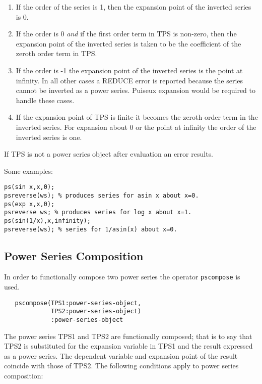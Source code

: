 \begin{enumerate}
\item If the order of the series is 1, then the expansion point of the
inverted series is 0.

\item If the order is 0 \emph{and} if the first order term in TPS
is non-zero, then the expansion point of the inverted series is taken
to be the coefficient of the zeroth order term in TPS.

\item If the order is -1 the expansion point of the inverted series
is the point at infinity.  In all other cases a REDUCE error is
reported because the series cannot be inverted as a power series.
Puiseux  expansion would be required to
handle these cases.

\item If the expansion point of TPS is finite it becomes the
zeroth order term in the inverted series. For expansion about 0 or the
point at infinity the order of the inverted series is one.
\end{enumerate}

If TPS is not a power series object after evaluation an error results.

Some examples:
\begin{verbatim}
ps(sin x,x,0);
psreverse(ws); % produces series for asin x about x=0.
ps(exp x,x,0);
psreverse ws; % produces series for log x about x=1.
ps(sin(1/x),x,infinity);
psreverse(ws); % series for 1/asin(x) about x=0.
\end{verbatim}

\subsection{Power Series Composition}
\hypertarget{operator:PSCOMPOSE}{}
In order to functionally compose two power series the operator
\texttt{pscompose} is used. 
\begin{verbatim}
   pscompose(TPS1:power-series-object,
             TPS2:power-series-object)
             :power-series-object
\end{verbatim}
The power series TPS1 and TPS2 are functionally composed;
that is to say that TPS2 is substituted for the expansion
variable in TPS1 and the result expressed as a power series. The
dependent variable and expansion point of the result coincide with
those of TPS2.  The following conditions apply to power series
composition:

